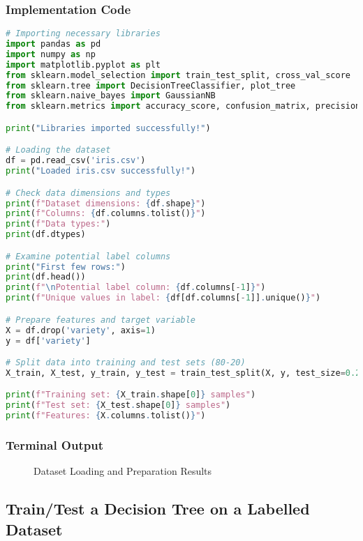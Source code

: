 \documentclass[12pt,a4paper]{article}
\begin{document}
\subsubsection{Implementation Code}
\begin{lstlisting}[language=Python, caption=Dataset Loading and Data Preparation]
# Importing necessary libraries
import pandas as pd
import numpy as np
import matplotlib.pyplot as plt
from sklearn.model_selection import train_test_split, cross_val_score
from sklearn.tree import DecisionTreeClassifier, plot_tree
from sklearn.naive_bayes import GaussianNB
from sklearn.metrics import accuracy_score, confusion_matrix, precision_score, recall_score

print("Libraries imported successfully!")

# Loading the dataset
df = pd.read_csv('iris.csv')
print("Loaded iris.csv successfully!")

# Check data dimensions and types
print(f"Dataset dimensions: {df.shape}")
print(f"Columns: {df.columns.tolist()}")
print(f"Data types:")
print(df.dtypes)

# Examine potential label columns
print("First few rows:")
print(df.head())
print(f"\nPotential label column: {df.columns[-1]}")
print(f"Unique values in label: {df[df.columns[-1]].unique()}")

# Prepare features and target variable
X = df.drop('variety', axis=1)
y = df['variety']

# Split data into training and test sets (80-20)
X_train, X_test, y_train, y_test = train_test_split(X, y, test_size=0.2, random_state=42, stratify=y)

print(f"Training set: {X_train.shape[0]} samples")
print(f"Test set: {X_test.shape[0]} samples")
print(f"Features: {X.columns.tolist()}")
\end{lstlisting}

\subsubsection{Terminal Output}
\begin{figure}[h!]
\centering
    \caption{Dataset Loading and Preparation Results}
\end{figure}

\subsection{Train/Test a Decision Tree on a Labelled Dataset}
\end{document}
